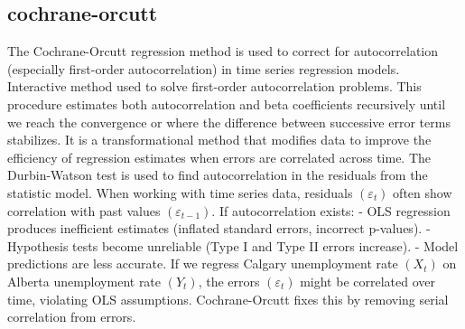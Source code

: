 \documentclass[11pt]{article}
\begin{document}
\subsection{cochrane-orcutt}
The Cochrane-Orcutt regression method is used to correct for autocorrelation (especially first-order autocorrelation) in time series regression models. Interactive method used to solve first-order autocorrelation problems. This procedure estimates both autocorrelation and beta coefficients recursively until we reach the convergence or where the difference between successive error terms stabilizes. It is a transformational method that modifies data to improve the efficiency of regression estimates when errors are correlated across time. The Durbin-Watson test is used to find autocorrelation in the residuals from the statistic model.
\newline
When working with time series data, residuals $(\varepsilon_t)$ often show correlation with past values $(\varepsilon_{t-1})$.
If autocorrelation exists:\newline
-    OLS regression produces inefficient estimates (inflated standard errors, incorrect p-values).\newline
-    Hypothesis tests become unreliable (Type I and Type II errors increase).\newline
-    Model predictions are less accurate.\newline
If we regress Calgary unemployment rate $(X_t)$ on Alberta unemployment rate $(Y_t)$, the errors $(\varepsilon_t)$ might be correlated over time, violating OLS assumptions.
Cochrane-Orcutt fixes this by removing serial correlation from errors.
\end{document}
